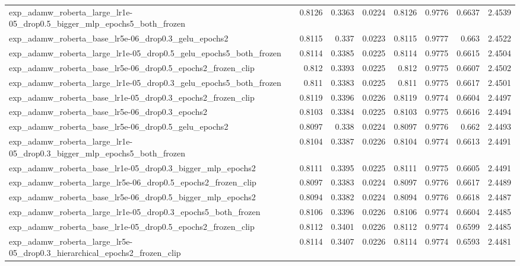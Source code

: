 \documentclass[a4paper,oneside,bibliography=totoc]{scrbook}
\begin{document}
\begin{landscape}
\begin{center}
\begin{longtable}{p{4cm} *{7}{r}}
\bottomrule
\endlastfoot
        exp\_adamw\_roberta\_large\_lr1e-05\_drop0.5\_bigger\_mlp\_epochs5\_both\_frozen & 0.8126 & 0.3363 & 0.0224 & 0.8126 & 0.9776 & 0.6637 & 2.4539 \\ 
        exp\_adamw\_roberta\_base\_lr5e-06\_drop0.3\_gelu\_epochs2 & 0.8115 & 0.337 & 0.0223 & 0.8115 & 0.9777 & 0.663 & 2.4522 \\ 
        exp\_adamw\_roberta\_large\_lr1e-05\_drop0.5\_gelu\_epochs5\_both\_frozen & 0.8114 & 0.3385 & 0.0225 & 0.8114 & 0.9775 & 0.6615 & 2.4504 \\ 
        exp\_adamw\_roberta\_base\_lr5e-06\_drop0.5\_epochs2\_frozen\_clip & 0.812 & 0.3393 & 0.0225 & 0.812 & 0.9775 & 0.6607 & 2.4502 \\ 
        exp\_adamw\_roberta\_large\_lr1e-05\_drop0.3\_gelu\_epochs5\_both\_frozen & 0.811 & 0.3383 & 0.0225 & 0.811 & 0.9775 & 0.6617 & 2.4501 \\ 
        exp\_adamw\_roberta\_base\_lr1e-05\_drop0.3\_epochs2\_frozen\_clip & 0.8119 & 0.3396 & 0.0226 & 0.8119 & 0.9774 & 0.6604 & 2.4497 \\ 
        exp\_adamw\_roberta\_base\_lr5e-06\_drop0.3\_epochs2 & 0.8103 & 0.3384 & 0.0225 & 0.8103 & 0.9775 & 0.6616 & 2.4494 \\ 
        exp\_adamw\_roberta\_base\_lr5e-06\_drop0.5\_gelu\_epochs2 & 0.8097 & 0.338 & 0.0224 & 0.8097 & 0.9776 & 0.662 & 2.4493 \\ 
        exp\_adamw\_roberta\_large\_lr1e-05\_drop0.3\_bigger\_mlp\_epochs5\_both\_frozen & 0.8104 & 0.3387 & 0.0226 & 0.8104 & 0.9774 & 0.6613 & 2.4491 \\ 
        exp\_adamw\_roberta\_base\_lr1e-05\_drop0.3\_bigger\_mlp\_epochs2 & 0.8111 & 0.3395 & 0.0225 & 0.8111 & 0.9775 & 0.6605 & 2.4491 \\ 
        exp\_adamw\_roberta\_large\_lr5e-06\_drop0.5\_epochs2\_frozen\_clip & 0.8097 & 0.3383 & 0.0224 & 0.8097 & 0.9776 & 0.6617 & 2.4489 \\ 
        exp\_adamw\_roberta\_base\_lr5e-06\_drop0.5\_bigger\_mlp\_epochs2 & 0.8094 & 0.3382 & 0.0224 & 0.8094 & 0.9776 & 0.6618 & 2.4487 \\ 
        exp\_adamw\_roberta\_large\_lr1e-05\_drop0.3\_epochs5\_both\_frozen & 0.8106 & 0.3396 & 0.0226 & 0.8106 & 0.9774 & 0.6604 & 2.4485 \\ 
        exp\_adamw\_roberta\_base\_lr1e-05\_drop0.5\_epochs2\_frozen\_clip & 0.8112 & 0.3401 & 0.0226 & 0.8112 & 0.9774 & 0.6599 & 2.4485 \\ 
        exp\_adamw\_roberta\_large\_lr5e-05\_drop0.3\_hierarchical\_epochs2\_frozen\_clip & 0.8114 & 0.3407 & 0.0226 & 0.8114 & 0.9774 & 0.6593 & 2.4481 \\ 

\end{longtable}
\end{center}
\end{landscape}
\end{document}
